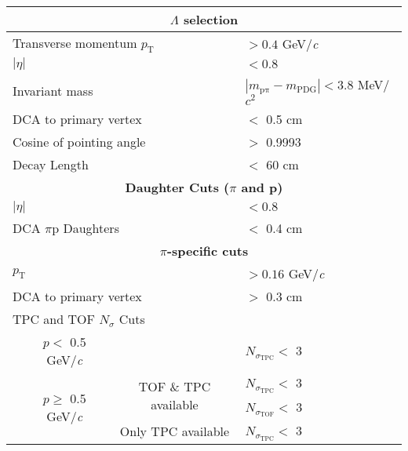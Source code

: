 \documentclass[ALICE,manyauthors]{cernphprep}
\newcommand{\Lam}{$\Lambda$\xspace}
\begin{document}
\begin{table}[htbp]
 \centering 
  \renewcommand{\arraystretch}{1.05}
  \begin{tabular}{lc|c|l}
   \hline  
   \multicolumn{4}{c}{\textbf{\Lam selection}} \\
   \hline
   \multicolumn{3}{l|}{Transverse momentum $p_{\mathrm{T}}$} & $> 0.4$ GeV/\textit{c} \\
   \hline
   \multicolumn{3}{l|}{$|\eta|$} & $< 0.8$ \\
   \hline
   \multicolumn{3}{l|}{Invariant mass} & $|m_{\mathrm{\mathrm{p}\pi}} - m_{\mathrm{PDG}}| < 3.8$ MeV/$c^{2}$ \\ 
   \hline
   \multicolumn{3}{l|}{DCA to primary vertex} & $<$ 0.5 cm \\
   \hline
   \multicolumn{3}{l|}{Cosine of pointing angle} & $>$ 0.9993 \\
   \hline
   \multicolumn{3}{l|}{Decay Length} & $<$ 60 cm \\
   \hline
   
   
   \multicolumn{4}{c}{\textbf{Daughter Cuts ($\pi$ and p)}} \\
   \hline
   \multicolumn{3}{l|}{$|\eta|$} &  $< 0.8$ \\
   \hline
   \multicolumn{3}{l|}{DCA $\pi$p Daughters} & $<$ 0.4 cm \\
   \hline
   
   
   \multicolumn{4}{c}{\textbf{$\pi$-specific cuts}} \\
   \hline
   \multicolumn{3}{l|}{$p_{\mathrm{T}}$} & $> 0.16$ GeV/\textit{c} \\
   \hline
   \multicolumn{3}{l|}{DCA to primary vertex} & $>$ 0.3 cm \\
   \hline
   \multicolumn{4}{l}{TPC and TOF $N_{\sigma}$ Cuts} \\
   \cline{2-4}
    & \multicolumn{1}{c}{$p <$ 0.5 GeV/\textit{c}} &  & $N_{\sigma_{\mathrm{TPC}}} <$ 3 \\
   \cline{2-4}
    & \multicolumn{1}{c}{\multirow{3}{*}{$p \geq$ 0.5 GeV/\textit{c}}} &  \multirow{2}{*}{TOF \& TPC available} & $N_{\sigma_{\mathrm{TPC}}} <$ 3 \\
    & \multicolumn{2}{c|}{} & $N_{\sigma_{\mathrm{TOF}}} <$ 3 \\
   \cline{3-4}
    & \multicolumn{1}{c}{} & Only TPC available & $N_{\sigma_{\mathrm{TPC}}} <$ 3 \\
   \hline
   

\end{tabular}
\end{table}
\end{document}

